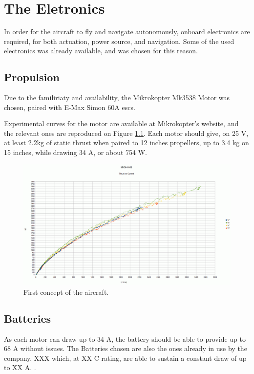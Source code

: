 
\chapter{The Eletronics} \label{chap:conc}

In order for the aircraft to fly and navigate autonomously, onboard electronics are required, for both actuation, power source, and navigation. Some of the used electronics was already available, and was chosen for this reason.
	
\section{Propulsion}

Due to the familiriaty and availability, the Mikrokopter Mk3538 Motor was chosen, paired with E-Max Simon 60A escs.

Experimental curves for the motor are available at Mikrokopter's website, and the relevant ones are reproduced on Figure \ref{fig:motorcurves}. Each motor should give, on 25 V, at least 2.2kg of static thrust when paired to 12 inches propellers, up to 3.4 kg on 15 inches, while drawing 34 A, or about 754 W.
\begin{figure}
\centering
  \includegraphics[width=\linewidth]{figs/motorcurves.png}
  \caption{First concept of the aircraft.}
  \label{fig:motorcurves}
\end{figure}


\section{Batteries}

As each motor can draw up to 34 A, the battery should be able to provide up to 68 A without issues.
The Batteries chosen are also the ones already in use by the company, XXX which, at XX C rating, are able to sustain a constant draw of up to XX A. .

